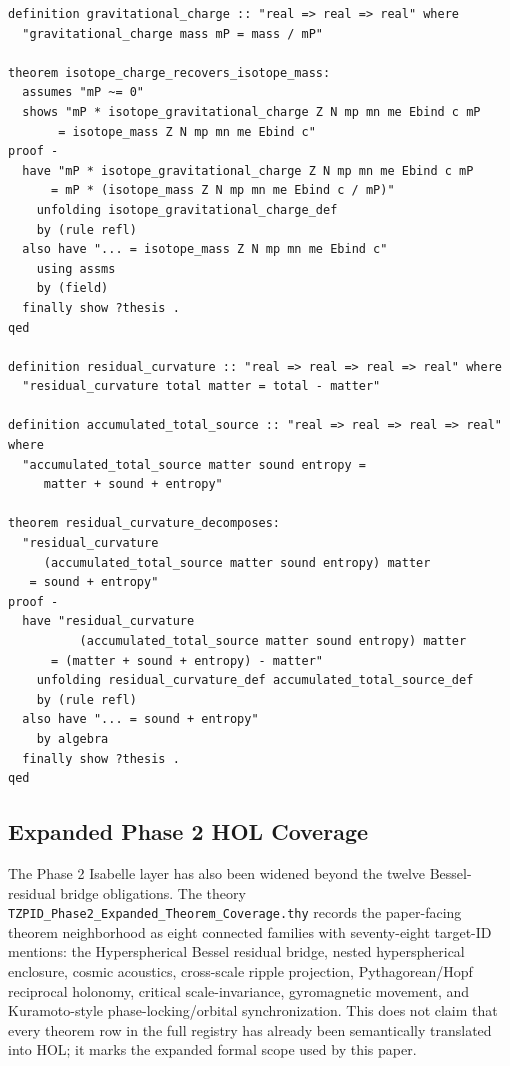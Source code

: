 \documentclass[11pt,a4paper]{article}
\begin{document}
\begin{lstlisting}
definition gravitational_charge :: "real => real => real" where
  "gravitational_charge mass mP = mass / mP"

theorem isotope_charge_recovers_isotope_mass:
  assumes "mP ~= 0"
  shows "mP * isotope_gravitational_charge Z N mp mn me Ebind c mP
       = isotope_mass Z N mp mn me Ebind c"
proof -
  have "mP * isotope_gravitational_charge Z N mp mn me Ebind c mP
      = mP * (isotope_mass Z N mp mn me Ebind c / mP)"
    unfolding isotope_gravitational_charge_def
    by (rule refl)
  also have "... = isotope_mass Z N mp mn me Ebind c"
    using assms
    by (field)
  finally show ?thesis .
qed

definition residual_curvature :: "real => real => real => real" where
  "residual_curvature total matter = total - matter"

definition accumulated_total_source :: "real => real => real => real" where
  "accumulated_total_source matter sound entropy =
     matter + sound + entropy"

theorem residual_curvature_decomposes:
  "residual_curvature
     (accumulated_total_source matter sound entropy) matter
   = sound + entropy"
proof -
  have "residual_curvature
          (accumulated_total_source matter sound entropy) matter
      = (matter + sound + entropy) - matter"
    unfolding residual_curvature_def accumulated_total_source_def
    by (rule refl)
  also have "... = sound + entropy"
    by algebra
  finally show ?thesis .
qed
\end{lstlisting}

\subsection{Expanded Phase 2 HOL Coverage}

The Phase 2 Isabelle layer has also been widened beyond the twelve Bessel-residual bridge obligations. The theory \texttt{TZPID\_Phase2\_Expanded\_Theorem\_Coverage.thy} records the paper-facing theorem neighborhood as eight connected families with seventy-eight target-ID mentions: the Hyperspherical Bessel residual bridge, nested hyperspherical enclosure, cosmic acoustics, cross-scale ripple projection, Pythagorean/Hopf reciprocal holonomy, critical scale-invariance, gyromagnetic movement, and Kuramoto-style phase-locking/orbital synchronization. This does not claim that every theorem row in the full registry has already been semantically translated into HOL; it marks the expanded formal scope used by this paper.
\end{document}
